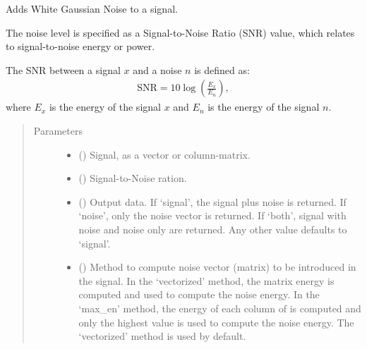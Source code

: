 \documentclass[letterpaper,10pt,english]{sphinxmanual}
\begin{document}
\begin{fulllineitems}
\label{\detokenize{pynoise.noise:pynoise.noise.awgn}}
Adds White Gaussian Noise to a signal.

The noise level is specified as a Signal-to-Noise Ratio (SNR) value,
which relates to signal-to-noise energy or power.

The SNR between a signal \(x\) and a noise \(n\) is defined as:
\begin{equation*}
\begin{split}\text{SNR} = 10\log\left(\frac{E_x}{E_n}\right),\end{split}
\end{equation*}
where \(E_x\) is the energy of the signal \(x\) and
\(E_n\) is the energy of the signal \(n\).
\begin{quote}\begin{description}
\item[{Parameters}] \leavevmode\begin{itemize}
\item {} 
 () \textendash{} Signal, as a vector or column-matrix.

\item {} 
 (\sphinxstyleliteralemphasis{\sphinxupquote{, }}) \textendash{} Signal-to-Noise ration.

\item {} 
 (\sphinxstyleliteralemphasis{\sphinxupquote{, }}) \textendash{} Output data. If ‘signal’, the signal  plus noise is
returned. If ‘noise’, only the noise vector is returned. If
‘both’, signal with noise and noise only are returned. Any
other value defaults to ‘signal’.

\item {} 
 (\sphinxstyleliteralemphasis{\sphinxupquote{, }}) \textendash{} Method to compute noise vector (matrix) to be introduced in the
signal. In the ‘vectorized’ method, the matrix energy is computed
and used to compute the noise energy. In the ‘max\_en’ method, the
energy of each column of  is computed and only the highest
value is used to compute the noise energy. The ‘vectorized’ method
is used by default.


\end{itemize}
\end{description}
\end{quote}
\end{fulllineitems}
\end{document}
